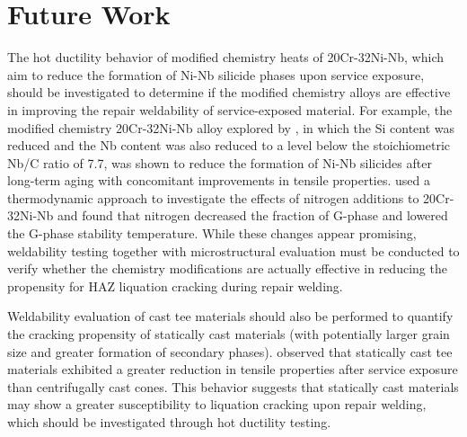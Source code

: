 \chapter{Future Work} \label{ch:future-work}
The hot ductility behavior of modified chemistry heats of 20Cr-32Ni-Nb, which aim to reduce the formation of Ni-Nb silicide phases upon service exposure, should be investigated to determine if the modified chemistry alloys are effective in improving the repair weldability of service-exposed material. For example, the modified chemistry 20Cr-32Ni-Nb alloy explored by \citet{hoffman_cast_2003}, in which the Si content was reduced and the Nb content was also reduced to a level below the stoichiometric Nb/C ratio of 7.7, was shown to reduce the formation of Ni-Nb silicides after long-term aging with concomitant improvements in tensile properties. \citet{dewar_correlation_2013} used a thermodynamic approach to investigate the effects of nitrogen additions to 20Cr-32Ni-Nb and found that nitrogen decreased the fraction of G-phase and lowered the G-phase stability temperature. While these changes appear promising, weldability testing together with microstructural evaluation must be conducted to verify whether the chemistry modifications are actually effective in reducing the propensity for HAZ liquation cracking during repair welding.

Weldability evaluation of cast tee materials should also be performed to quantify the cracking propensity of statically cast materials (with potentially larger grain size and greater formation of secondary phases). \citet{hoffman_high_2000-1} observed that statically cast tee materials exhibited a greater reduction in tensile properties after service exposure than centrifugally cast cones. This behavior suggests that statically cast materials may show a greater susceptibility to liquation cracking upon repair welding, which should be investigated through hot ductility testing.


